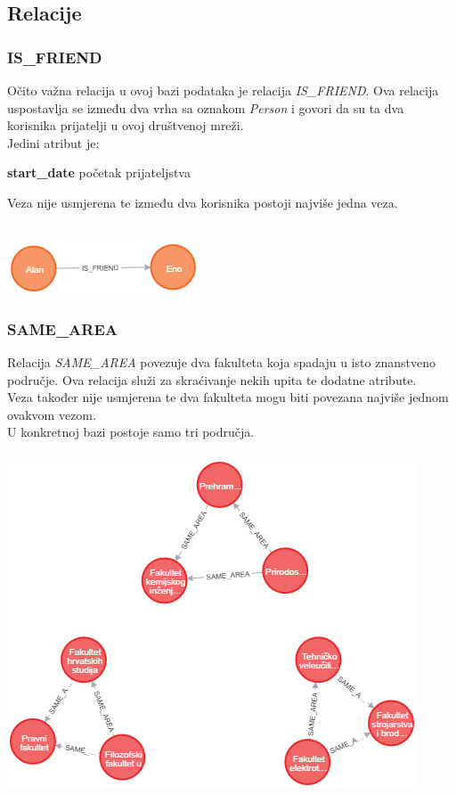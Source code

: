 \documentclass[titlepage, 12pt]{scrartcl}
\begin{document}
\subsection{Relacije}
\subsubsection{IS\_FRIEND}
Očito važna relacija u ovoj bazi podataka je relacija \emph{IS\_FRIEND}. Ova relacija uspostavlja se između dva vrha sa oznakom \emph{Person} i govori da su ta dva korisnika prijatelji u ovoj društvenoj mreži. \\
Jedini atribut je:
\begin{itemize}
\begin{samepage}
    \item \textbf{start\_date} početak prijateljstva
\end{samepage}
\end{itemize}
Veza nije usmjerena te između dva korisnika postoji najviše jedna veza. \\ \\
\begin{center}
    \includegraphics{slike/IS_FRIEND.png}
\end{center}

\subsubsection{SAME\_AREA}
Relacija \emph{SAME\_AREA} povezuje dva fakulteta koja spadaju u isto znanstveno područje. Ova relacija služi za skraćivanje nekih upita te dodatne atribute. \\
Veza također nije usmjerena te dva fakulteta mogu biti povezana najviše jednom ovakvom vezom. \\
U konkretnoj bazi postoje samo tri područja.
\\ \\
\includegraphics{slike/SAME_AREA.png}
\end{document}
